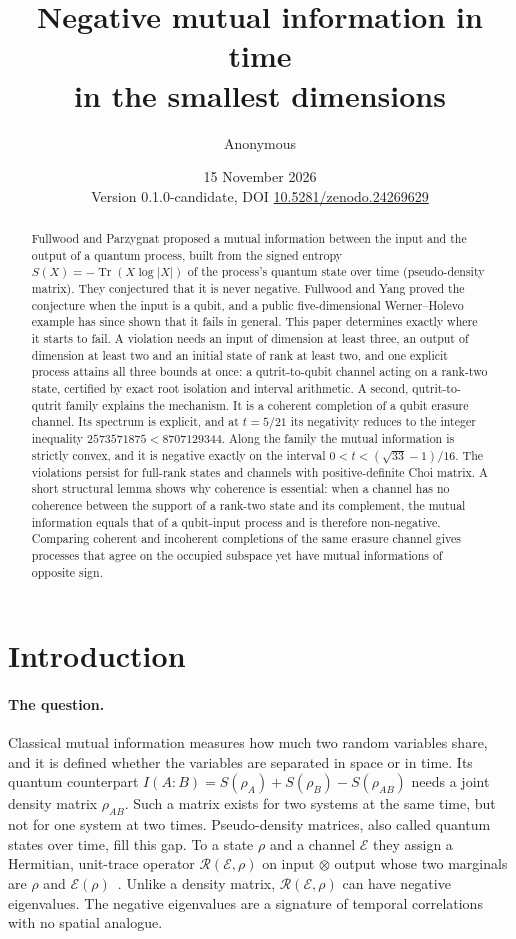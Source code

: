 \documentclass[11pt,a4paper]{article}
\title{Negative mutual information in time\\in the smallest dimensions}
\author{Anonymous}
\date{15 November 2026\\[2pt]\small Version 0.1.0-candidate, DOI \href{https://doi.org/10.5281/zenodo.24269629}{10.5281/zenodo.24269629}}
\theoremstyle{definition}\newtheorem{definition}[theorem]{Definition}
\theoremstyle{remark}\newtheorem{remark}[theorem]{Remark}
\newcommand{\Tr}{\operatorname{Tr}}
\newcommand{\E}{\mathcal E}
\newcommand{\R}{\mathcal R}
\begin{document}
\maketitle

\begin{abstract}
Fullwood and Parzygnat proposed a mutual information between the input and the output of a quantum process, built from the signed entropy $S(X)=-\Tr(X\log|X|)$ of the process's quantum state over time (pseudo-density matrix). They conjectured that it is never negative. Fullwood and Yang proved the conjecture when the input is a qubit, and a public five-dimensional Werner--Holevo example has since shown that it fails in general. This paper determines exactly where it starts to fail. A violation needs an input of dimension at least three, an output of dimension at least two and an initial state of rank at least two, and one explicit process attains all three bounds at once: a qutrit-to-qubit channel acting on a rank-two state, certified by exact root isolation and interval arithmetic. A second, qutrit-to-qutrit family explains the mechanism. It is a coherent completion of a qubit erasure channel. Its spectrum is explicit, and at $t=5/21$ its negativity reduces to the integer inequality $2573571875<8707129344$. Along the family the mutual information is strictly convex, and it is negative exactly on the interval $0<t<(\sqrt{33}-1)/16$. The violations persist for full-rank states and channels with positive-definite Choi matrix. A short structural lemma shows why coherence is essential: when a channel has no coherence between the support of a rank-two state and its complement, the mutual information equals that of a qubit-input process and is therefore non-negative. Comparing coherent and incoherent completions of the same erasure channel gives processes that agree on the occupied subspace yet have mutual informations of opposite sign.
\end{abstract}

\section{Introduction}

\paragraph{The question.} Classical mutual information measures how much two random variables share, and it is defined whether the variables are separated in space or in time. Its quantum counterpart $I(A{:}B)=S(\rho_A)+S(\rho_B)-S(\rho_{AB})$ needs a joint density matrix $\rho_{AB}$. Such a matrix exists for two systems at the same time, but not for one system at two times. Pseudo-density matrices, also called quantum states over time, fill this gap. To a state $\rho$ and a channel $\E$ they assign a Hermitian, unit-trace operator $\R(\E,\rho)$ on input $\otimes$ output whose two marginals are $\rho$ and $\E(\rho)$~\cite{FP,WPVF,FY}. Unlike a density matrix, $\R(\E,\rho)$ can have negative eigenvalues. The negative eigenvalues are a signature of temporal correlations with no spatial analogue.
\end{document}
